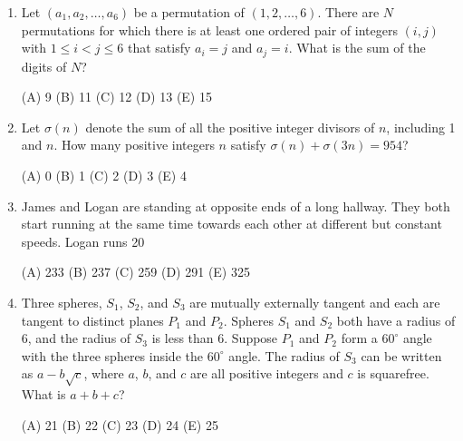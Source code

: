 \documentclass[12pt]{scrartcl}
\begin{document}
\begin{enumerate}
\quad (A) 3 \quad (B) 4 \quad (C) 5 \quad (D) 6 \quad (E) 7

\item Let $(a_{1},a_{2},\dots,a_{6})$ be a permutation of $(1, 2, \dots, 6)$. There are $N$ permutations for which there is at least one ordered pair of integers $(i, j)$ with $1\le i<j\le6$ that satisfy $a_{i}=j$ and $a_{j}=i$. What is the sum of the digits of $N$?

\quad (A) 9 \quad (B) 11 \quad (C) 12 \quad (D) 13 \quad (E) 15

\item Let $\sigma(n)$ denote the sum of all the positive integer divisors of $n$, including 1 and $n$. How many positive integers $n$ satisfy $\sigma(n)+\sigma(3n)=954$?

\quad (A) 0 \quad (B) 1 \quad (C) 2 \quad (D) 3 \quad (E) 4

\item James and Logan are standing at opposite ends of a long hallway. They both start running at the same time towards each other at different but constant speeds. Logan runs 20%

\quad (A) 233 \quad (B) 237 \quad (C) 259 \quad (D) 291 \quad (E) 325

\item Three spheres, $S_{1}$, $S_{2}$, and $S_{3}$ are mutually externally tangent and each are tangent to distinct planes $P_{1}$ and $P_{2}$. Spheres $S_{1}$ and $S_{2}$ both have a radius of 6, and the radius of $S_{3}$ is less than 6. Suppose $P_{1}$ and $P_2$ form a $60^{\circ}$ angle with the three spheres inside the $60^{\circ}$ angle. The radius of $S_{3}$ can be written as $a-b\sqrt{c}$, where $a$, $b$, and $c$ are all positive integers and $c$ is squarefree. What is $a+b+c$?

\quad (A) 21 \quad (B) 22 \quad (C) 23 \quad (D) 24 \quad (E) 25

\end{enumerate}
\end{document}
